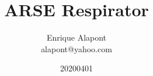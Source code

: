 \documentclass[two column, oneside]{article}
\title{ARSE Respirator}
\author{Enrique Alapont\\alapont@yahoo.com}
\date{20200401}
\begin{document}
 
    \maketitle
    
    
    
    
    
    
    
    
    
    \clearpage
    \listoffigures
    
    
    
    \onecolumn
    \appendix
    \appendixpage
    
    
\end{document}
